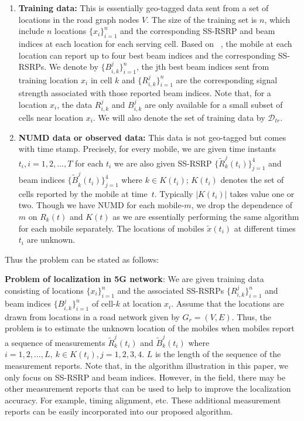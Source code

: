 \documentclass[conference, 10pt]{IEEEtran}
\newcommand{\abs}[1]{\lvert #1 \rvert}
\newcommand{\card}[1]{\abs{#1}}
\begin{document}
\begin{enumerate}

\item \textbf{Training data:} This is essentially geo-tagged data sent from
a set of locations in the road graph nodes $V$. The size of the training set is $n$, which include $n$ locations
$\{x_i\}_{i=1}^n$ and the corresponding SS-RSRP and beam indices at each location for each serving cell. Based on ~\cite{5GTF}, 
the mobile at each location can report up to four best beam indices and the corresponding SS-RSRPs.
We denote by $\{B^{j}_{i,k}\}_{i=1}^n$, the jth best beam indices sent from training location $x_i$ in cell $k$ and $\{R^j_{i,k}\}_{i=1}^n$ are the corresponding signal strength 
associated with those reported beam indices. Note
that, for a location $x_i$, the data $R^j_{i,k}$  and $B^j_{i,k}$ are only available
for a small subset of cells near location $x_i$. We will also denote the set of
training data by $\mathcal{D}_{tr}$.

\item \textbf{NUMD data or observed data:} This data is not geo-tagged but comes
with time stamp. Precisely, for every mobile, we are given time instants
$t_i, i=1,2,\hdots,T$ for each $t_i$ we are also given SS-RSRP
$\{{\tilde{R}}^j_k(t_i)\}_{j=1}^4$ and beam indices ${\{\tilde{B}}^j_k(t_i)\}_{j=1}^4$ where $k\in K(t_i)$; $K(t_i)$ denotes the set of cells reported by
the mobile at time~$t$. Typically $\card{K(t_i)}$ takes value one or two.
Though we have NUMD for each mobile-$m$, we drop the dependence of $m$
on $R_k(t)$ and $K(t)$ as we are essentially performing the same algorithm
for each mobile separately. The locations of mobiles $\tilde{x}(t_i)$ at different
times $t_i$ are unknown.
	
\end{enumerate} 

Thus the problem can be stated as follows:

{\bf Problem of localization in 5G network}: 
We are given training data consisting
of locations $\{x_i\}_{i=1}^n$ and the associated SS-RSRPs  $\{R^j_{i,k}\}_{i=1}^n$ and beam indices $\{B^j_{i,k}\}_{i=1}^n$ of
cell-$k$ at location $x_i$. Assume that the locations
are drawn from locations in a road network given by $G_r=(V,E)$. Thus, the problem is to estimate the unknown location of the mobiles when mobiles report a sequence of measurements
${\tilde{R}}^j_k(t_i)$ and ${\tilde{B}}^j_k(t_i)$ where $i=1,2,\hdots,L,\ k\in K(t_i), j=1, 2, 3, 4$. $L$ is the length of the sequence of the measurement reports.
Note that, in the algorithm illustration in this paper, we only focus on SS-RSRP and beam indices. However, in the field, there may be other measurement reports that 
can be used to help to improve the localization accuracy. For example, timing alignment, etc. These additional measurement reports can be easily incorporated into our proposed algorithm.
\end{document}
